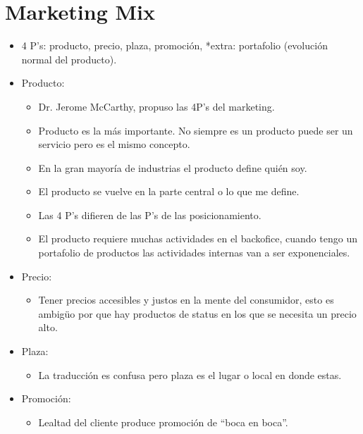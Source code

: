 \section{Marketing Mix}
\begin{itemize}
    \item 4 P's: producto, precio, plaza, promoción, *extra: portafolio (evolución normal del producto).
    
    \item Producto: 
        \begin{itemize}
            \item Dr. Jerome McCarthy, propuso las 4P's del marketing.
            \item Producto es la más importante. No siempre es un producto puede ser un servicio pero es el mismo concepto.
            \item En la gran mayoría de industrias el producto define quién soy.
            \item El producto se vuelve en la parte central o lo que me define.
            \item Las 4 P's difieren de las P's de las posicionamiento.
            \item El producto requiere muchas actividades en el backofice, cuando tengo un portafolio de productos las actividades internas van a ser exponenciales.
        \end{itemize}

    
    \item Precio: 
        \begin{itemize}
            \item Tener precios accesibles y justos en la mente del consumidor, esto es ambigüo por que hay productos de status en los que se necesita un precio alto.
        \end{itemize}

    \item Plaza: 
        \begin{itemize}
            \item La traducción es confusa pero plaza es el lugar o local en donde estas.
        \end{itemize}
        
    \item Promoción: 
        \begin{itemize}
            \item Lealtad del cliente produce promoción de ``boca en boca''.
        \end{itemize}
\end{itemize}


